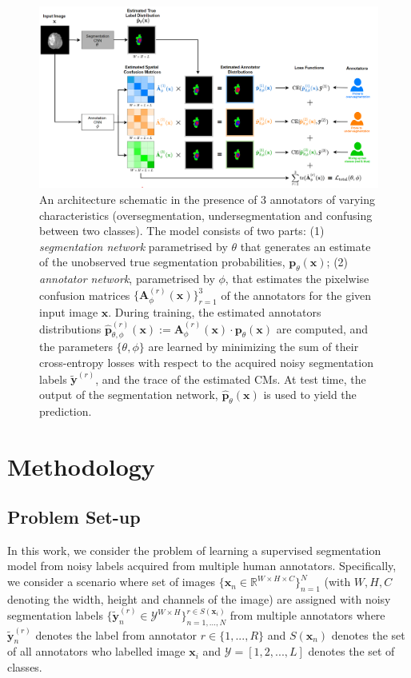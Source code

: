 \begin{figure}[h]
    \centering
    \includegraphics[width=\linewidth]{chapter_8/picture1.png}
    \caption{An architecture schematic in the presence of 3 annotators of varying characteristics (oversegmentation, undersegmentation and confusing between two classes). The model consists of two parts: (1) \textit{segmentation network} parametrised by $\theta$ that generates an estimate of the unobserved true segmentation probabilities, $\textbf{p}_{\theta}(\textbf{x})$; (2) \textit{annotator network}, parametrised by $\phi$, that estimates the pixelwise confusion matrices $\{\textbf{A}_{\phi}^{(r)}(\textbf{x})\}_{r=1}^{3}$ of the annotators  for the given input image $\textbf{x}$. During training, the estimated annotators distributions $\hat{\textbf{p}}_{\theta,\phi}^{(r)}(\textbf{x}):=\textbf{A}_{\phi}^{(r)}(\textbf{x})\cdot\textbf{p}_{\theta}(\textbf{x})$ are computed, and the parameters $\{\theta, \phi\}$ are learned by minimizing the sum of their cross-entropy losses with respect to the acquired noisy segmentation labels $\tilde{\mathbf{y}}^{(r)}$, and the trace of the estimated CMs. At test time, the output of the segmentation network, $\hat{\textbf{p}}_{\theta}(\textbf{x})$ is used to yield the prediction.}
    \label{picture1}
\end{figure}

\section{Methodology}

\subsection{Problem Set-up}
In this work, we consider the problem of learning a supervised segmentation model from noisy labels acquired from multiple human annotators. Specifically, we consider a scenario where set of images $\{\textbf{x}_n \in \mathbb{R}^{W\times H\times C}\}_{n=1}^N$ (with $W, H, C$ denoting the width, height and channels of the image) are assigned with noisy segmentation labels $\{\tilde{\textbf{y}}_n^{(r)} \in \mathcal{Y}^{W\times H}\}_{n=1,...,N}^{r\in S(\mathbf{x}_i)}$ from multiple annotators where $\tilde{\textbf{y}}_n^{(r)}$ denotes the label from annotator $r \in \{1,...,R\}$ and $S(\mathbf{x}_n)$ denotes the set of all annotators who labelled image $\textbf{x}_i$ and $\mathcal{Y}=[1, 2,...,L]$ denotes the set of classes. 


